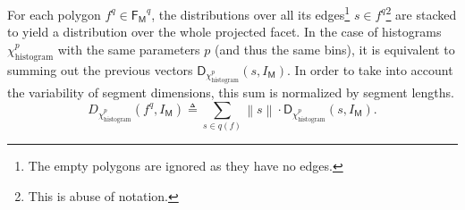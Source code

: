         \begin{figure}[htpb]
            \begin{center}
            \end{center}
        \end{figure}

        For each polygon \(f^q \in \mathsf{F_M}^q\), the distributions over all its edges\footnote{The empty polygons are ignored as they have no edges.} \(s \in f^q\)\footnote{This is abuse of notation.} are stacked to yield a distribution over the whole projected facet.
        In the case of histograms $\chi^p_{\operatorname{histogram}}$ with the same parameters \(p\) (and thus the same bins), it is equivalent to summing out the previous vectors $\mathsf{D}_{\chi^p_{\operatorname{histogram}}}(s, I_{\mathsf{M}})$.
        In order to take into account the variability of segment dimensions, this sum is normalized by segment lengths.\\
        \begin{equation}
            \label{eq::corr_fac}
            D_{\chi^p_{\operatorname{histogram}}}\left(f^q, I_{\mathsf{M}}\right) \triangleq \sum_{s \in q\left(f\right)} \left\rVert s \right\lVert \cdot \mathsf{D}_{\chi^p_{\operatorname{histogram}}}(s, I_{\mathsf{M}}).
        \end{equation}

